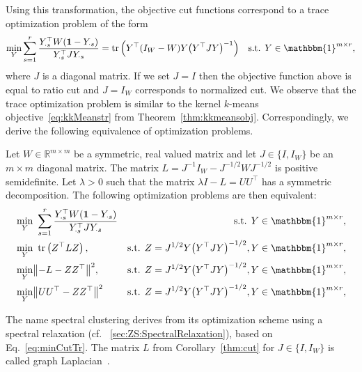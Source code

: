 Using this transformation, the objective cut functions correspond to a trace optimization problem of the form
\begin{align*}
\min_Y &\sum_{s=1}^r\frac{Y_{\cdot s}^\top W (\mathbf{1}-Y_{\cdot s})}{Y_{\cdot s}^\top J Y_{\cdot s}} 
= \tr\left(Y^\top (I_{W}-W)Y \bigl(Y^\top JY\bigl)^{-1}\right) &\text{s.t. }Y\in\mathbbm{1}^{m\times r},
\end{align*}
where $J$ is a diagonal matrix. If we set $J=I$ then the objective function above is equal to ratio cut and $J=I_W$ corresponds to normalized cut.
We observe that the trace optimization problem is similar to the kernel $k$-means objective~\eqref{eq:kkMeanstr} from Theorem~\ref{thm:kkmeansobj}. Correspondingly, we derive the following equivalence of optimization problems.
\begin{corollary}\label{thm:cut}
Let $W\in\mathbb{R}^{m\times m}$ be a symmetric, real valued matrix and let $J\in\{I,I_W\}$ be an $m\times m$ diagonal matrix. The matrix
$L=J^{-1}I_W-J^{-1/2}WJ^{-1/2}$ is positive semidefinite.
Let $\lambda>0$ such that the matrix $\lambda I-L=UU^\top$ has a symmetric decomposition. The following optimization problems are then equivalent: 
\begin{align}
&\min_Y\ \sum_{s=1}^r\frac{Y_{\cdot s}^\top W (\mathbf{1}-Y_{\cdot s})}{Y_{\cdot s}^\top J Y_{\cdot s}} & \text{s.t. } Y\in\mathbbm{1}^{m\times r},\\
&\min_Y\ \tr\left(Z^\top LZ\right), & \text{s.t. } Z=J^{1/2}Y\bigl(Y^\top JY\bigr)^{-1/2}, Y\in\mathbbm{1}^{m\times r},\label{eq:minCutTr}\\ 
&\min_Y \bigl\lVert -L-ZZ^\top\bigr\rVert ^2, & \text{s.t. } Z=J^{1/2}Y\bigl(Y^\top JY\bigr)^{-1/2}, Y\in\mathbbm{1}^{m\times r}, \label{eq:minCutNorm} \\
&\min_Y \bigl\lVert UU^\top-ZZ^\top\bigr\rVert ^2 & \text{s.t. } Z=J^{1/2}Y\bigl(Y^\top JY\bigr)^{-1/2}, Y\in\mathbbm{1}^{m\times r}, \label{eq:minCutU}
\end{align}
\end{corollary}
The name spectral clustering derives from its optimization scheme using a spectral relaxation (cf. \@Section~\ref{sec:ZS:SpectralRelaxation}), based on Eq.~\eqref{eq:minCutTr}.
The matrix $L$ from Corollary~\ref{thm:cut} for $J\in\{I,I_W\}$ is called graph Laplacian~\citep{mohar1991laplacian,chung1997spectral}. 

